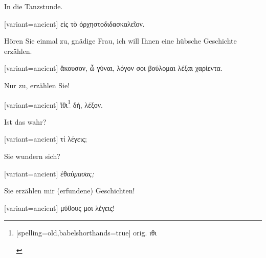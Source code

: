 In die Tanzstunde. 

\switchcolumn

\begin{greek}[variant=ancient]%
εἰς τὸ ὀρχηστοδιδασκαλεῖον.

\end{greek}%
Hören Sie einmal zu, gnädige Frau, ich will Ihnen eine hübsche Geschichte
erzählen. 

\switchcolumn

\begin{greek}[variant=ancient]%
ἄκουσον, ὦ γύναι, λόγον σοι βούλομαι λέξαι χαρίεντα.

\end{greek}%
\switchcolumn*

Nur zu, erzählen Sie! 

\switchcolumn

\begin{greek}[variant=ancient]%
ἴθι\footnote{\begin{german}[spelling=old,babelshorthands=true]%
orig. \textgreek[variant=ancient]{ιθι}\end{german}%
} δὴ, λέξον.

\end{greek}%
\switchcolumn*

Ist das wahr? 

\switchcolumn

\begin{greek}[variant=ancient]%
τί λέγεις;

\end{greek}%
\switchcolumn*

Sie wundern sich? 

\switchcolumn

\begin{greek}[variant=ancient]%
ἐθαύ\textit{μασας;}

\end{greek}%
\switchcolumn*

Sie erzählen mir (erfundene) Geschichten! 

\switchcolumn

\begin{greek}[variant=ancient]%
μύθους μοι λέγεις!

\end{greek}%
\switchcolumn*

